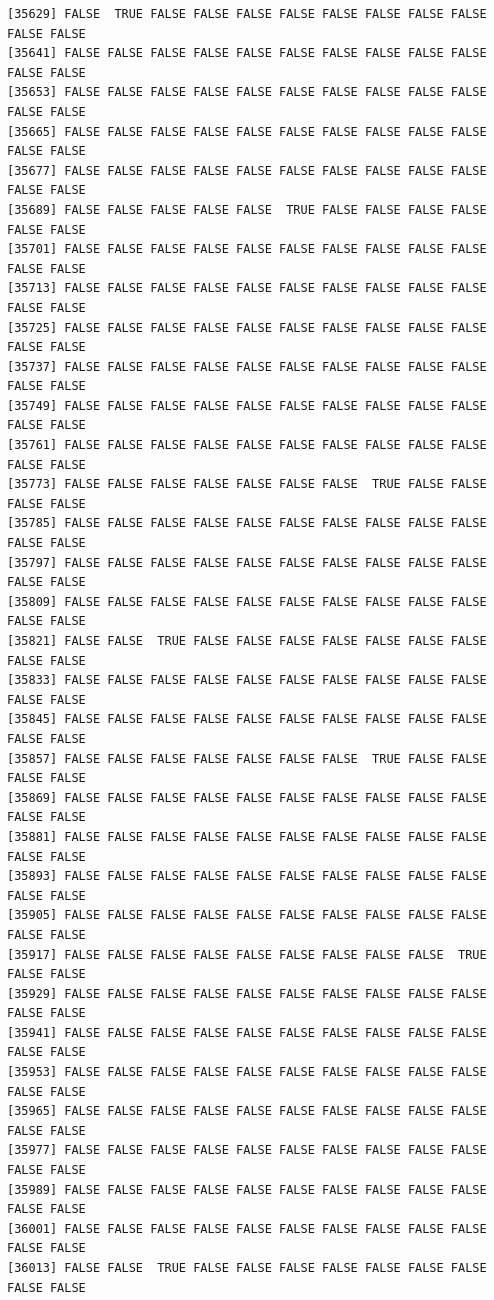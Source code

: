 \documentclass[
  a4paper,
  DIV=11,
  numbers=noendperiod]{scrartcl}
\begin{document}
\begin{verbatim}
[35629] FALSE  TRUE FALSE FALSE FALSE FALSE FALSE FALSE FALSE FALSE FALSE FALSE
[35641] FALSE FALSE FALSE FALSE FALSE FALSE FALSE FALSE FALSE FALSE FALSE FALSE
[35653] FALSE FALSE FALSE FALSE FALSE FALSE FALSE FALSE FALSE FALSE FALSE FALSE
[35665] FALSE FALSE FALSE FALSE FALSE FALSE FALSE FALSE FALSE FALSE FALSE FALSE
[35677] FALSE FALSE FALSE FALSE FALSE FALSE FALSE FALSE FALSE FALSE FALSE FALSE
[35689] FALSE FALSE FALSE FALSE FALSE  TRUE FALSE FALSE FALSE FALSE FALSE FALSE
[35701] FALSE FALSE FALSE FALSE FALSE FALSE FALSE FALSE FALSE FALSE FALSE FALSE
[35713] FALSE FALSE FALSE FALSE FALSE FALSE FALSE FALSE FALSE FALSE FALSE FALSE
[35725] FALSE FALSE FALSE FALSE FALSE FALSE FALSE FALSE FALSE FALSE FALSE FALSE
[35737] FALSE FALSE FALSE FALSE FALSE FALSE FALSE FALSE FALSE FALSE FALSE FALSE
[35749] FALSE FALSE FALSE FALSE FALSE FALSE FALSE FALSE FALSE FALSE FALSE FALSE
[35761] FALSE FALSE FALSE FALSE FALSE FALSE FALSE FALSE FALSE FALSE FALSE FALSE
[35773] FALSE FALSE FALSE FALSE FALSE FALSE FALSE  TRUE FALSE FALSE FALSE FALSE
[35785] FALSE FALSE FALSE FALSE FALSE FALSE FALSE FALSE FALSE FALSE FALSE FALSE
[35797] FALSE FALSE FALSE FALSE FALSE FALSE FALSE FALSE FALSE FALSE FALSE FALSE
[35809] FALSE FALSE FALSE FALSE FALSE FALSE FALSE FALSE FALSE FALSE FALSE FALSE
[35821] FALSE FALSE  TRUE FALSE FALSE FALSE FALSE FALSE FALSE FALSE FALSE FALSE
[35833] FALSE FALSE FALSE FALSE FALSE FALSE FALSE FALSE FALSE FALSE FALSE FALSE
[35845] FALSE FALSE FALSE FALSE FALSE FALSE FALSE FALSE FALSE FALSE FALSE FALSE
[35857] FALSE FALSE FALSE FALSE FALSE FALSE FALSE  TRUE FALSE FALSE FALSE FALSE
[35869] FALSE FALSE FALSE FALSE FALSE FALSE FALSE FALSE FALSE FALSE FALSE FALSE
[35881] FALSE FALSE FALSE FALSE FALSE FALSE FALSE FALSE FALSE FALSE FALSE FALSE
[35893] FALSE FALSE FALSE FALSE FALSE FALSE FALSE FALSE FALSE FALSE FALSE FALSE
[35905] FALSE FALSE FALSE FALSE FALSE FALSE FALSE FALSE FALSE FALSE FALSE FALSE
[35917] FALSE FALSE FALSE FALSE FALSE FALSE FALSE FALSE FALSE  TRUE FALSE FALSE
[35929] FALSE FALSE FALSE FALSE FALSE FALSE FALSE FALSE FALSE FALSE FALSE FALSE
[35941] FALSE FALSE FALSE FALSE FALSE FALSE FALSE FALSE FALSE FALSE FALSE FALSE
[35953] FALSE FALSE FALSE FALSE FALSE FALSE FALSE FALSE FALSE FALSE FALSE FALSE
[35965] FALSE FALSE FALSE FALSE FALSE FALSE FALSE FALSE FALSE FALSE FALSE FALSE
[35977] FALSE FALSE FALSE FALSE FALSE FALSE FALSE FALSE FALSE FALSE FALSE FALSE
[35989] FALSE FALSE FALSE FALSE FALSE FALSE FALSE FALSE FALSE FALSE FALSE FALSE
[36001] FALSE FALSE FALSE FALSE FALSE FALSE FALSE FALSE FALSE FALSE FALSE FALSE
[36013] FALSE FALSE  TRUE FALSE FALSE FALSE FALSE FALSE FALSE FALSE FALSE FALSE

\end{verbatim}
\end{document}
